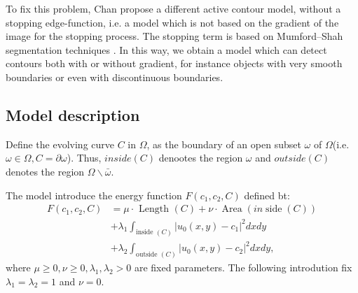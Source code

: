 \documentclass[journal]{IEEEtran}
\begin{document}
To fix this problem, Chan\cite{ne} propose a different active contour model, without a stopping edge-function, i.e. a model which is not based on the gradient of the image for the stopping process. The stopping term is based on Mumford–Shah segmentation techniques \cite{ne18}. In this way, we obtain a model which can detect contours both with or without gradient, for instance objects with very smooth boundaries or even with discontinuous boundaries.

\subsection{Model description}
Define the evolving curve $C$ in $\Omega$, as the boundary of an open subset $\omega$ of $\Omega$(i.e. $\omega\in\Omega, C=\partial\omega$). Thus, $inside(C)$ denootes the region $\omega$ and $outside(C)$ denotes the region $\Omega\backslash\bar{\omega}$.

The model introduce the energy function $F(c_1,c_2,C)$ defined bt:
\begin{equation}\begin{aligned}
    F\left(c_{1}, c_{2}, C\right)&= \mu \cdot \text { Length }(C)+\nu \cdot \operatorname{Area}(i n \operatorname{side}(C)) \\
    &+\lambda_{1} \int_{\text {inside }(C)}\left|u_{0}(x, y)-c_{1}\right|^{2} d x d y \\
    &+\lambda_{2} \int_{\text {outside }(C)}\left|u_{0}(x, y)-c_{2}\right|^{2} d x d y,
\end{aligned}\end{equation}
where $\mu\geq 0, \nu\geq 0, \lambda_1,\lambda_2>0$ are fixed parameters. The following introdution fix $\lambda_1=\lambda_2=1$ and $\nu=0$.
\end{document}
